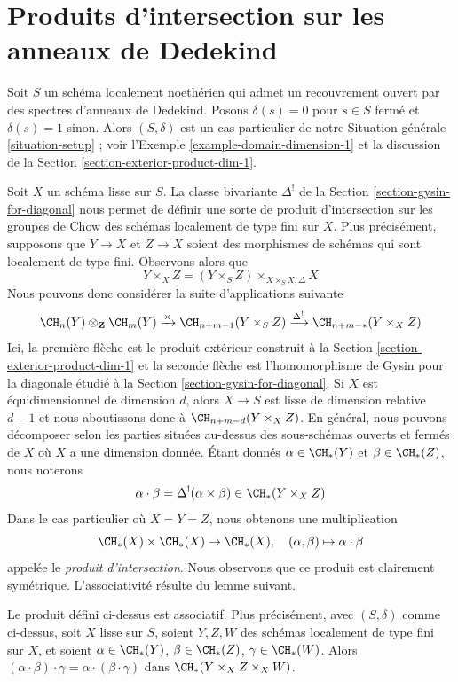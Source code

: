 \section{Produits d'intersection sur les anneaux de Dedekind}
\label{section-intersection-product-dim-1}

\noindent
Soit $S$ un schéma localement noethérien qui admet un recouvrement ouvert
par des spectres d'anneaux de Dedekind. Posons $\delta(s) = 0$ pour $s \in S$ fermé
et $\delta(s) = 1$ sinon. Alors $(S, \delta)$ est un cas particulier de notre
Situation générale \ref{situation-setup} ; voir
l'Exemple \ref{example-domain-dimension-1} et la discussion de la
Section \ref{section-exterior-product-dim-1}.

\medskip\noindent
Soit $X$ un schéma lisse sur $S$. La classe bivariante $\Delta^!$
de la Section \ref{section-gysin-for-diagonal} nous permet de définir une sorte de
produit d'intersection sur les groupes de Chow des schémas localement de type fini sur $X$.
Plus précisément, supposons que $Y \to X$ et $Z \to X$ soient des morphismes de schémas
qui sont localement de type fini. Observons alors que
$$
Y \times_X Z =  (Y \times_S Z) \times_{X \times_S X, \Delta} X
$$
Nous pouvons donc considérer la suite d'applications suivante
$$
\CH_n(Y) \otimes_\mathbf{Z} \CH_m(Y)
\xrightarrow{\times}
\CH_{n + m - 1}(Y \times_S Z)
\xrightarrow{\Delta^!}
\CH_{n + m - *}(Y \times_X Z)
$$
Ici, la première flèche est le produit extérieur construit à la
Section \ref{section-exterior-product-dim-1} et la seconde flèche
est l'homomorphisme de Gysin pour la diagonale étudié à la
Section \ref{section-gysin-for-diagonal}. Si $X$ est équidimensionnel
de dimension $d$, alors $X \to S$ est lisse de dimension relative $d - 1$
et nous aboutissons donc à $\CH_{n + m - d}(Y \times_X Z)$.
En général, nous pouvons décomposer selon les parties situées au-dessus des sous-schémas
ouverts et fermés de $X$ où $X$ a une dimension donnée.
Étant donnés $\alpha \in \CH_*(Y)$ et $\beta \in \CH_*(Z)$, nous noterons
$$
\alpha \cdot \beta = \Delta^!(\alpha \times \beta)
\in \CH_*(Y \times_X Z)
$$
Dans le cas particulier où $X = Y = Z$, nous obtenons une multiplication
$$
\CH_*(X) \times \CH_*(X) \to \CH_*(X),\quad
(\alpha, \beta) \mapsto \alpha \cdot \beta
$$
appelée le {\it produit d'intersection}. Nous observons que
ce produit est clairement symétrique. L'associativité résulte du
lemme suivant.

\begin{lemma}
\label{lemma-associative-dim-1}
Le produit défini ci-dessus est associatif. Plus précisément, avec
$(S, \delta)$ comme ci-dessus, soit $X$ lisse sur $S$,
soient $Y, Z, W$ des schémas localement de type fini sur $X$, et soient
$\alpha \in \CH_*(Y)$, $\beta \in \CH_*(Z)$, $\gamma \in \CH_*(W)$.
Alors $(\alpha \cdot \beta) \cdot \gamma =
\alpha \cdot (\beta \cdot \gamma)$ dans $\CH_*(Y \times_X Z \times_X W)$.
\end{lemma}

